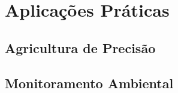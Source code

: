 \section{Aplicações Práticas}


\subsection{Agricultura de Precisão}


\subsection{Monitoramento Ambiental}

